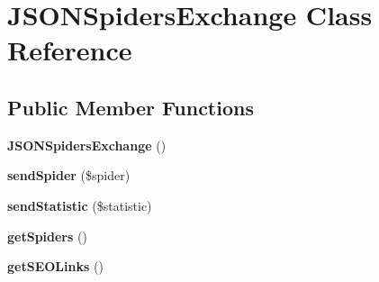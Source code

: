 \hypertarget{class_j_s_o_n_spiders_exchange}{\section{J\-S\-O\-N\-Spiders\-Exchange Class Reference}
\label{class_j_s_o_n_spiders_exchange}
}
\subsection*{Public Member Functions}
\begin{DoxyCompactItemize}
\item 
\hypertarget{class_j_s_o_n_spiders_exchange_a94148fba0c7fa7341b018c962ef791f9}{{\bfseries J\-S\-O\-N\-Spiders\-Exchange} ()}\label{class_j_s_o_n_spiders_exchange_a94148fba0c7fa7341b018c962ef791f9}

\item 
\hypertarget{class_j_s_o_n_spiders_exchange_acccb4227ead49e99ee69acf3e07f7d5a}{{\bfseries send\-Spider} (\$spider)}\label{class_j_s_o_n_spiders_exchange_acccb4227ead49e99ee69acf3e07f7d5a}

\item 
\hypertarget{class_j_s_o_n_spiders_exchange_a249fef51c925deaf1d5052e8b695567b}{{\bfseries send\-Statistic} (\$statistic)}\label{class_j_s_o_n_spiders_exchange_a249fef51c925deaf1d5052e8b695567b}

\item 
\hypertarget{class_j_s_o_n_spiders_exchange_a009bf5de24af5a103b4aa34544657cac}{{\bfseries get\-Spiders} ()}\label{class_j_s_o_n_spiders_exchange_a009bf5de24af5a103b4aa34544657cac}

\item 
\hypertarget{class_j_s_o_n_spiders_exchange_ad89ff84a2b29b0e4143d55a2f7b4d070}{{\bfseries get\-S\-E\-O\-Links} ()}\label{class_j_s_o_n_spiders_exchange_ad89ff84a2b29b0e4143d55a2f7b4d070}

\end{DoxyCompactItemize}
